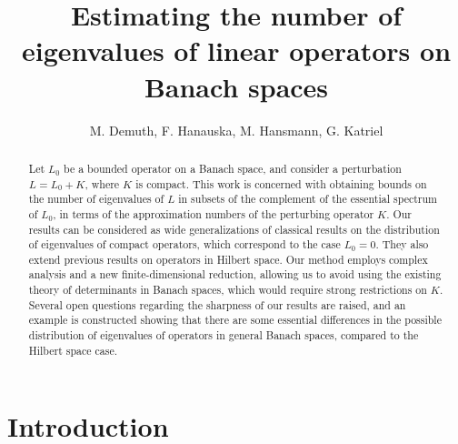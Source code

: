 \documentclass[12pt,a4paper]{article}
\theoremstyle{definition}
\theoremstyle{remark}
\numberwithin{equation}{section}
\begin{document}
\title{Estimating the number of eigenvalues of linear operators on Banach spaces}
\author{M. Demuth\footnotemark[1], F. Hanauska\footnotemark[1], M. Hansmann\footnotemark[2], G. Katriel\footnotemark[3]}
\date{}
\maketitle






\renewcommand{\thefootnote}{\fnsymbol{footnote}}

\begin{abstract}
Let $L_0$ be a bounded operator on a Banach space, and consider a perturbation $L=L_0+K$, where $K$ is compact. This work is concerned with obtaining bounds
on the number of eigenvalues of $L$ in subsets of the complement of the essential spectrum of $L_0$, in terms of the approximation numbers of the perturbing operator $K$.
Our results can be considered as wide generalizations of classical results on the distribution of eigenvalues of compact operators, which correspond to the case $L_0=0$.
They also extend previous results on operators in Hilbert space. Our method employs complex analysis and a new finite-dimensional reduction, allowing us  
to avoid using the existing theory of determinants in Banach spaces, which would require strong restrictions on $K$. Several open questions regarding the sharpness of our
results are raised, and an example is constructed showing that there are some essential differences in the possible distribution of eigenvalues of operators in general 
Banach spaces, compared to the Hilbert space case. 
\end{abstract}

\section{Introduction}
\end{document}
